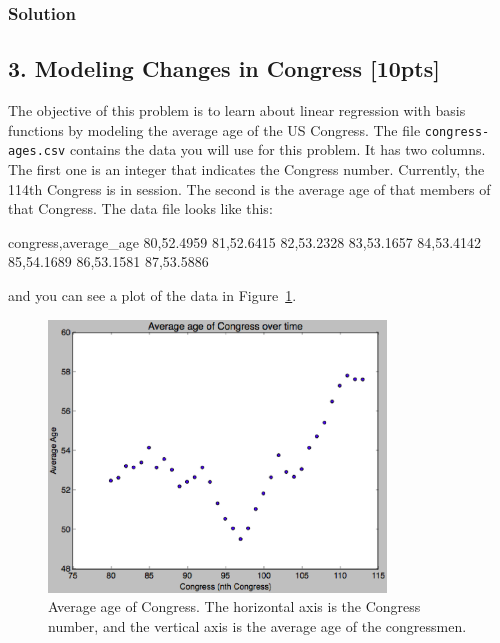 \documentclass[submit]{harvardml}
\begin{document}
	
	\subsubsection*{Solution}
	
	
	
	
	
	
	
	
	
	
	
	
	
	
	
	
	
	
	
	
	
	
	
	
	
	
	
	\newpage
	\subsection*{3. Modeling Changes in Congress [10pts]}
	The objective of this problem is to learn about linear regression with basis
	functions by modeling the average age of the US Congress. The file
	\verb|congress-ages.csv| contains the data you will use for this problem.  It
	has two columns.  The first one is an integer that indicates the Congress
	number. Currently, the 114th Congress is in session. The second is the average
	age of that members of that Congress.  The data file looks like this:
	\begin{csv}
		congress,average_age
		80,52.4959
		81,52.6415
		82,53.2328
		83,53.1657
		84,53.4142
		85,54.1689
		86,53.1581
		87,53.5886
	\end{csv}
	and you can see a plot of the data in Figure~\ref{fig:congress}.
	
	\begin{figure}[h]
		\centering
		\includegraphics[width=0.8\textwidth]{congress-ages.eps}
		\caption{Average age of Congress.  The horizontal axis is the Congress number, and the vertical axis is the average age of the congressmen.}
		\label{fig:congress}
	\end{figure}
	
\end{document}
